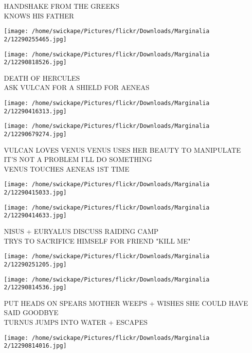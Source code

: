 \documentclass[10pt,letterpaper]{article}
\begin{document}
HANDSHAKE FROM THE GREEKS\\
KNOWS HIS FATHER\\
\pagebreak

\texttt{[image: /home/swickape/Pictures/flickr/Downloads/Marginalia 2/12290255465.jpg]}

\vspace{0.25in}
\texttt{[image: /home/swickape/Pictures/flickr/Downloads/Marginalia 2/12290818526.jpg]}

DEATH OF HERCULES\\
ASK VULCAN FOR A SHIELD FOR AENEAS\\
\pagebreak

\texttt{[image: /home/swickape/Pictures/flickr/Downloads/Marginalia 2/12290416313.jpg]}

\vspace{0.25in}
\texttt{[image: /home/swickape/Pictures/flickr/Downloads/Marginalia 2/12290679274.jpg]}

VULCAN LOVES VENUS VENUS USES HER BEAUTY TO MANIPULATE IT'S NOT A PROBLEM I'LL DO SOMETHING\\
VENUS TOUCHES AENEAS 1ST TIME\\
\pagebreak

\texttt{[image: /home/swickape/Pictures/flickr/Downloads/Marginalia 2/12290415033.jpg]}

\vspace{0.25in}
\texttt{[image: /home/swickape/Pictures/flickr/Downloads/Marginalia 2/12290414633.jpg]}

NISUS + EURYALUS DISCUSS RAIDING CAMP\\
TRYS TO SACRIFICE HIMSELF FOR FRIEND "KILL ME"\\
\pagebreak

\texttt{[image: /home/swickape/Pictures/flickr/Downloads/Marginalia 2/12290251205.jpg]}

\vspace{0.25in}
\texttt{[image: /home/swickape/Pictures/flickr/Downloads/Marginalia 2/12290814536.jpg]}

PUT HEADS ON SPEARS MOTHER WEEPS + WISHES SHE COULD HAVE SAID GOODBYE\\
TURNUS JUMPS INTO WATER + ESCAPES\\
\pagebreak

\texttt{[image: /home/swickape/Pictures/flickr/Downloads/Marginalia 2/12290814016.jpg]}
\end{document}
